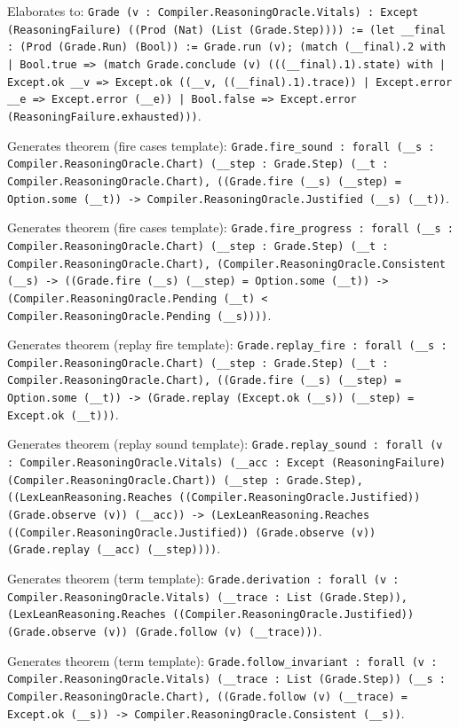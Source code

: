 \documentclass[11pt]{article}
\begin{document}
\noindent Elaborates to: \texttt{Grade (v : Compiler.ReasoningOracle.Vitals) : Except (ReasoningFailure) ((Prod (Nat) (List (Grade.Step)))) := (let \_\_final : (Prod (Grade.Run) (Bool)) := Grade.run (v); (match (\_\_final).2 with | Bool.true => (match Grade.conclude (v) (((\_\_final).1).state) with | Except.ok \_\_v => Except.ok ((\_\_v, ((\_\_final).1).trace)) | Except.error \_\_e => Except.error (\_\_e)) | Bool.false => Except.error (ReasoningFailure.exhausted)))}.\par
\noindent Generates theorem (fire cases template): \texttt{Grade.fire\_sound : forall (\_\_s : Compiler.ReasoningOracle.Chart) (\_\_step : Grade.Step) (\_\_t : Compiler.ReasoningOracle.Chart), ((Grade.fire (\_\_s) (\_\_step) = Option.some (\_\_t)) -> Compiler.ReasoningOracle.Justified (\_\_s) (\_\_t))}.\par
\noindent Generates theorem (fire cases template): \texttt{Grade.fire\_progress : forall (\_\_s : Compiler.ReasoningOracle.Chart) (\_\_step : Grade.Step) (\_\_t : Compiler.ReasoningOracle.Chart), (Compiler.ReasoningOracle.Consistent (\_\_s) -> ((Grade.fire (\_\_s) (\_\_step) = Option.some (\_\_t)) -> (Compiler.ReasoningOracle.Pending (\_\_t) < Compiler.ReasoningOracle.Pending (\_\_s))))}.\par
\noindent Generates theorem (replay fire template): \texttt{Grade.replay\_fire : forall (\_\_s : Compiler.ReasoningOracle.Chart) (\_\_step : Grade.Step) (\_\_t : Compiler.ReasoningOracle.Chart), ((Grade.fire (\_\_s) (\_\_step) = Option.some (\_\_t)) -> (Grade.replay (Except.ok (\_\_s)) (\_\_step) = Except.ok (\_\_t)))}.\par
\noindent Generates theorem (replay sound template): \texttt{Grade.replay\_sound : forall (v : Compiler.ReasoningOracle.Vitals) (\_\_acc : Except (ReasoningFailure) (Compiler.ReasoningOracle.Chart)) (\_\_step : Grade.Step), ((LexLeanReasoning.Reaches ((Compiler.ReasoningOracle.Justified)) (Grade.observe (v)) (\_\_acc)) -> (LexLeanReasoning.Reaches ((Compiler.ReasoningOracle.Justified)) (Grade.observe (v)) (Grade.replay (\_\_acc) (\_\_step))))}.\par
\noindent Generates theorem (term template): \texttt{Grade.derivation : forall (v : Compiler.ReasoningOracle.Vitals) (\_\_trace : List (Grade.Step)), (LexLeanReasoning.Reaches ((Compiler.ReasoningOracle.Justified)) (Grade.observe (v)) (Grade.follow (v) (\_\_trace)))}.\par
\noindent Generates theorem (term template): \texttt{Grade.follow\_invariant : forall (v : Compiler.ReasoningOracle.Vitals) (\_\_trace : List (Grade.Step)) (\_\_s : Compiler.ReasoningOracle.Chart), ((Grade.follow (v) (\_\_trace) = Except.ok (\_\_s)) -> Compiler.ReasoningOracle.Consistent (\_\_s))}.\par
\end{document}
